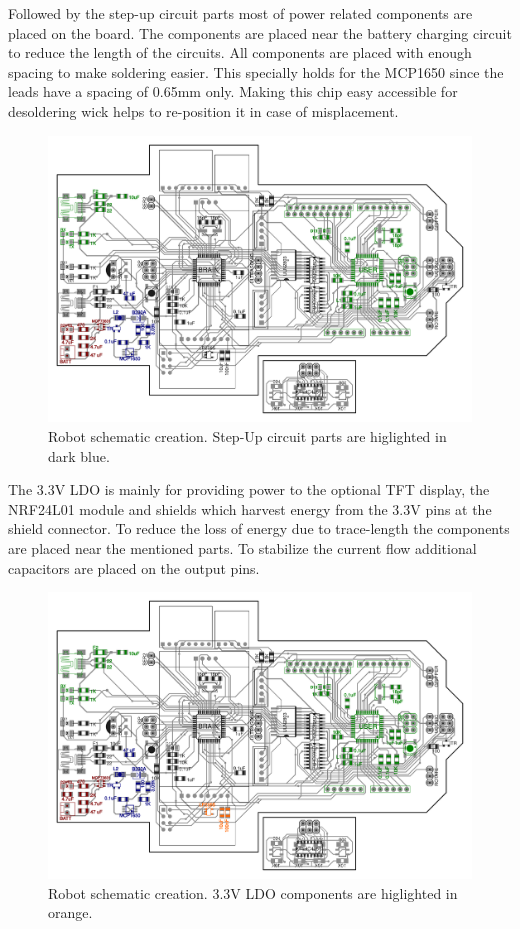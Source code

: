 \documentclass[11pt,a4paper]{article}
\begin{document}
Followed by the step-up circuit parts most of power related components are placed on the board. The components are placed near the battery charging circuit to reduce the length of the circuits. All components are placed with enough spacing to make soldering easier. This specially holds for the MCP1650 since the leads have a spacing of 0.65mm only. Making this chip easy accessible for desoldering wick helps to re-position it in case of misplacement. 

\begin{figure}[H]
  \centering
  \includegraphics[width=\textwidth]{robot_schematic_stepup.pdf}
  \caption{Robot schematic creation. Step-Up circuit parts are higlighted in dark blue.}
\end{figure}

The 3.3V LDO is mainly for providing power to the optional TFT display, the NRF24L01 module and shields which harvest energy from the 3.3V pins at the shield connector. To reduce the loss of energy due to trace-length the components are placed near the mentioned parts. To stabilize the current flow additional capacitors are placed on the output pins. 

\begin{figure}[H]
  \centering
  \includegraphics[width=\textwidth]{robot_schematic_3_3v.pdf}
  \caption{Robot schematic creation. 3.3V LDO components are higlighted in orange.}
\end{figure}
\end{document}
